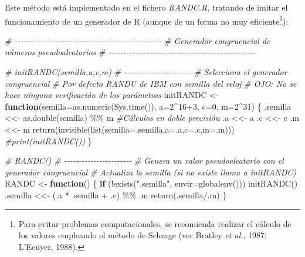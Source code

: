 \documentclass[
]{book}
\newenvironment{Shaded}{\begin{snugshade}}{\end{snugshade}}
\newcommand{\AttributeTok}[1]{\textcolor[rgb]{0.77,0.63,0.00}{#1}}
\newcommand{\CommentTok}[1]{\textcolor[rgb]{0.56,0.35,0.01}{\textit{#1}}}
\newcommand{\ControlFlowTok}[1]{\textcolor[rgb]{0.13,0.29,0.53}{\textbf{#1}}}
\newcommand{\DecValTok}[1]{\textcolor[rgb]{0.00,0.00,0.81}{#1}}
\newcommand{\FunctionTok}[1]{\textcolor[rgb]{0.00,0.00,0.00}{#1}}
\newcommand{\NormalTok}[1]{#1}
\newcommand{\OtherTok}[1]{\textcolor[rgb]{0.56,0.35,0.01}{#1}}
\newcommand{\SpecialCharTok}[1]{\textcolor[rgb]{0.00,0.00,0.00}{#1}}
\newcommand{\StringTok}[1]{\textcolor[rgb]{0.31,0.60,0.02}{#1}}
\theoremstyle{break}
\theoremstyle{definition}
\theoremstyle{definition}
\theoremstyle{definition}
\theoremstyle{definition}
\theoremstyle{remark}
\begin{document}
Este método está implementado en el fichero \emph{RANDC.R}, tratando de imitar el funcionamiento de un generador de R (aunque de un forma no muy eficiente\footnote{Para evitar problemas computacionales, se recomienda realizar el cálculo de los valores empleando el método de Schrage (ver Bratley \emph{et al.}, 1987; L'Ecuyer, 1988).}):

\begin{Shaded}
\begin{Highlighting}[]
\CommentTok{\# {-}{-}{-}{-}{-}{-}{-}{-}{-}{-}{-}{-}{-}{-}{-}{-}{-}{-}{-}{-}{-}{-}{-}{-}{-}{-}{-}{-}{-}{-}{-}{-}{-}{-}{-}{-}{-}{-}{-}{-}{-}{-}{-}{-}{-}{-}{-}{-}{-}{-}}
\CommentTok{\# Generador congruencial de números pseudoaleatorios}
\CommentTok{\# {-}{-}{-}{-}{-}{-}{-}{-}{-}{-}{-}{-}{-}{-}{-}{-}{-}{-}{-}{-}{-}{-}{-}{-}{-}{-}{-}{-}{-}{-}{-}{-}{-}{-}{-}{-}{-}{-}{-}{-}{-}{-}{-}{-}{-}{-}{-}{-}{-}{-}}

\CommentTok{\# initRANDC(semilla,a,c,m)}
\CommentTok{\# {-}{-}{-}{-}{-}{-}{-}{-}{-}{-}{-}{-}{-}{-}{-}{-}{-}{-}{-}{-}{-}{-}{-}}
\CommentTok{\#   Selecciona el generador congruencial}
\CommentTok{\#   Por defecto RANDU de IBM con semilla del reloj}
\CommentTok{\#   OJO: No se hace ninguna verificación de los parámetros}
\NormalTok{initRANDC }\OtherTok{\textless{}{-}} \ControlFlowTok{function}\NormalTok{(}\AttributeTok{semilla=}\FunctionTok{as.numeric}\NormalTok{(}\FunctionTok{Sys.time}\NormalTok{()), }\AttributeTok{a=}\DecValTok{2}\SpecialCharTok{\^{}}\DecValTok{16}\SpecialCharTok{+}\DecValTok{3}\NormalTok{, }\AttributeTok{c=}\DecValTok{0}\NormalTok{, }\AttributeTok{m=}\DecValTok{2}\SpecialCharTok{\^{}}\DecValTok{31}\NormalTok{) \{}
\NormalTok{  .semilla }\OtherTok{\textless{}\textless{}{-}} \FunctionTok{as.double}\NormalTok{(semilla) }\SpecialCharTok{\%\%}\NormalTok{ m  }\CommentTok{\#Cálculos en doble precisión}
\NormalTok{  .a }\OtherTok{\textless{}\textless{}{-}}\NormalTok{ a}
\NormalTok{  .c }\OtherTok{\textless{}\textless{}{-}}\NormalTok{ c}
\NormalTok{  .m }\OtherTok{\textless{}\textless{}{-}}\NormalTok{ m}
  \FunctionTok{return}\NormalTok{(}\FunctionTok{invisible}\NormalTok{(}\FunctionTok{list}\NormalTok{(}\AttributeTok{semilla=}\NormalTok{.semilla,}\AttributeTok{a=}\NormalTok{.a,}\AttributeTok{c=}\NormalTok{.c,}\AttributeTok{m=}\NormalTok{.m))) }\CommentTok{\#print(initRANDC())}
\NormalTok{\}}

\CommentTok{\# RANDC()}
\CommentTok{\# {-}{-}{-}{-}{-}{-}{-}{-}{-}{-}{-}{-}{-}{-}{-}{-}{-}{-}{-}{-}{-}{-}{-}}
\CommentTok{\#   Genera un valor pseudoaleatorio con el generador congruencial}
\CommentTok{\#   Actualiza la semilla (si no existe llama a initRANDC)}
\NormalTok{RANDC }\OtherTok{\textless{}{-}} \ControlFlowTok{function}\NormalTok{() \{}
    \ControlFlowTok{if}\NormalTok{ (}\SpecialCharTok{!}\FunctionTok{exists}\NormalTok{(}\StringTok{".semilla"}\NormalTok{, }\AttributeTok{envir=}\FunctionTok{globalenv}\NormalTok{())) }\FunctionTok{initRANDC}\NormalTok{()}
\NormalTok{    .semilla }\OtherTok{\textless{}\textless{}{-}}\NormalTok{ (.a }\SpecialCharTok{*}\NormalTok{ .semilla }\SpecialCharTok{+}\NormalTok{ .c) }\SpecialCharTok{\%\%}\NormalTok{ .m}
    \FunctionTok{return}\NormalTok{(.semilla}\SpecialCharTok{/}\NormalTok{.m)}
\NormalTok{\}}


\end{Highlighting}
\end{Shaded}
\end{document}

